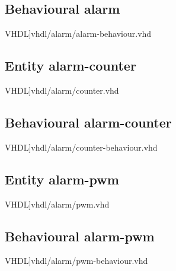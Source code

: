 \subsection{Behavioural alarm}
\scriptsize 
  VHDL]{vhdl/alarm/alarm-behaviour.vhd}
 \normalsize
\label{code:beh_alarm}
\subsection{Entity alarm-counter}
\scriptsize 
  VHDL]{vhdl/alarm/counter.vhd}
 \normalsize
\label{code:ent_alarm_counter}
\subsection{Behavioural alarm-counter}
\scriptsize 
  VHDL]{vhdl/alarm/counter-behaviour.vhd}
 \normalsize
\label{code:beh_alarm_counter}
\subsection{Entity alarm-pwm}
\scriptsize 
  VHDL]{vhdl/alarm/pwm.vhd}
 \normalsize
\label{code:ent_alarm_pwm}
\subsection{Behavioural alarm-pwm}
\scriptsize 
  VHDL]{vhdl/alarm/pwm-behaviour.vhd}
 \normalsize
\label{code:beh_alarm_pwm}
